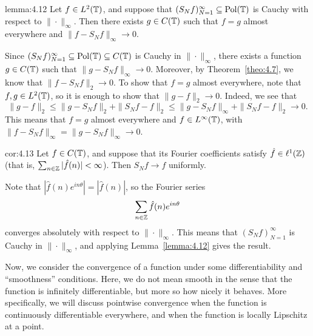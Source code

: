 \begin{lemma}{lemma:4.12}
    Let $f \in L^2(\mathbb{T})$, and suppose that $(S_N f)_{N=1}^\infty 
    \subseteq \operatorname{Pol}(\mathbb{T})$ is Cauchy with respect to $\|\cdot\|_\infty$. 
    Then there exists $g \in C(\mathbb{T})$ such that $f = g$ almost everywhere 
    and $\|f - S_N f\|_\infty \to 0$. 
\end{lemma}
\begin{pf}
    Since $(S_N f)_{N=1}^\infty \subseteq \operatorname{Pol}(\mathbb{T}) \subseteq C(\mathbb{T})$ is 
    Cauchy in $\|\cdot\|_\infty$, there exists a function $g \in C(\mathbb{T})$ such 
    that $\|g - S_N f\|_\infty \to 0$. Moreover, by Theorem~\ref{theo:4.7}, 
    we know that $\|f - S_N f\|_2 \to 0$. To show that $f = g$
    almost everywhere, note that $f, g \in L^2(\mathbb{T})$, so it is enough 
    to show that $\|g - f\|_2 \to 0$. Indeed, we see that 
    \[ \|g - f\|_2 \leq \|g - S_N f\|_2 + \|S_N f - f\|_2 
    \leq \|g - S_N f\|_\infty + \|S_N f - f\|_2 \to 0. \]
    This means that $f = g$ almost everywhere and $f \in L^\infty(\mathbb{T})$, 
    with $\|f - S_N f\|_\infty = \|g - S_N f\|_\infty \to 0$. 
\end{pf}

\begin{cor}{cor:4.13}
    Let $f \in C(\mathbb{T})$, and suppose that its Fourier coefficients satisfy 
    $\hat f \in \ell^1(\mathbb{Z})$ (that is, $\sum_{n\in\mathbb{Z}} |\hat f(n)| < \infty$). 
    Then $S_N f \to f$ uniformly. 
\end{cor}
\begin{pf}
    Note that $|\hat f(n) e^{in\theta}| = |\hat f(n)|$, so the Fourier series 
    \[ \sum_{n\in\mathbb{Z}} \hat f(n) e^{in\theta} \] 
    converges absolutely with respect to $\|\cdot\|_\infty$. This 
    means that $(S_N f)_{N=1}^\infty$ is Cauchy in $\|\cdot\|_\infty$, 
    and applying Lemma~\ref{lemma:4.12} gives the result. 
\end{pf}

Now, we consider the convergence of a function under some differentiability 
and ``smoothness'' conditions. Here, we do not mean smooth in the sense 
that the function is infinitely differentiable, but more so how nicely 
it behaves. More specifically, we will discuss pointwise convergence 
when the function is continuously differentiable everywhere, 
and when the function is locally Lipschitz at a point. 

